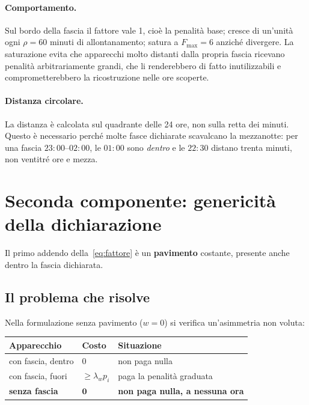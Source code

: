 \paragraph{Comportamento.} Sul bordo della fascia il fattore vale 1, cioè la penalità base; cresce
di un'unità ogni $\rho = 60$ minuti di allontanamento; satura a $F_{\max} = 6$ anziché divergere.
La saturazione evita che apparecchi molto distanti dalla propria fascia ricevano penalità
arbitrariamente grandi, che li renderebbero di fatto inutilizzabili e comprometterebbero la
ricostruzione nelle ore scoperte.

\paragraph{Distanza circolare.} La distanza è calcolata sul quadrante delle 24 ore, non sulla retta
dei minuti. Questo è necessario perché molte fasce dichiarate scavalcano la mezzanotte: per una
fascia $23{:}00$--$02{:}00$, le $01{:}00$ sono \emph{dentro} e le $22{:}30$ distano trenta minuti,
non ventitré ore e mezza.

\section{Seconda componente: genericità della dichiarazione}

Il primo addendo della~\eqref{eq:fattore} è un \textbf{pavimento} costante, presente anche dentro
la fascia dichiarata.

\subsection{Il problema che risolve}

Nella formulazione senza pavimento ($w = 0$) si verifica un'asimmetria non voluta:

\begin{center}
\begin{tabularx}{\textwidth}{@{}l l X@{}}
\toprule
\textbf{Apparecchio} & \textbf{Costo} & \textbf{Situazione} \\
\midrule
con fascia, dentro    & $0$        & non paga nulla \\
con fascia, fuori     & $\ge \lambda_w p_i$ & paga la penalità graduata \\
\textbf{senza fascia} & $\mathbf{0}$ & \textbf{non paga nulla, a nessuna ora} \\
\bottomrule
\end{tabularx}
\end{center}

